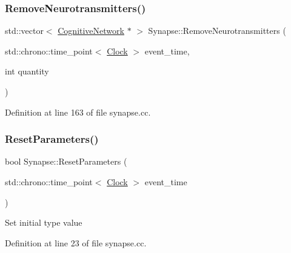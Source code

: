 \subsubsection{\texorpdfstring{Remove\+Neurotransmitters()}{RemoveNeurotransmitters()}}
{\footnotesize\ttfamily std\+::vector$<$ \mbox{\hyperlink{class_cognitive_network}{Cognitive\+Network}} $\ast$ $>$ Synapse\+::\+Remove\+Neurotransmitters (\begin{DoxyParamCaption}\item[{std\+::chrono\+::time\+\_\+point$<$ \mbox{\hyperlink{universe_8h_a0ef8d951d1ca5ab3cfaf7ab4c7a6fd80}{Clock}} $>$}]{event\+\_\+time,  }\item[{int}]{quantity }\end{DoxyParamCaption})}



Definition at line 163 of file synapse.\+cc.

\mbox{\label{class_synapse_a5b2bbc3553e92492a5c38d1d797fcd92}} 
\subsubsection{\texorpdfstring{Reset\+Parameters()}{ResetParameters()}}
{\footnotesize\ttfamily bool Synapse\+::\+Reset\+Parameters (\begin{DoxyParamCaption}\item[{std\+::chrono\+::time\+\_\+point$<$ \mbox{\hyperlink{universe_8h_a0ef8d951d1ca5ab3cfaf7ab4c7a6fd80}{Clock}} $>$}]{event\+\_\+time }\end{DoxyParamCaption})}

Set initial type value 

Definition at line 23 of file synapse.\+cc.

